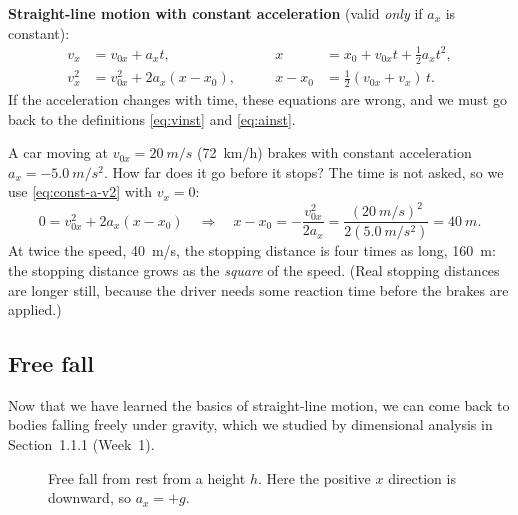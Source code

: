 \documentclass[11pt,a4paper]{article}
\begin{document}
\begin{keyresult}
\textbf{Straight-line motion with constant acceleration} (valid \emph{only} if $a_x$ is constant):
\[
\begin{aligned}
  v_x &= v_{0x} + a_x t , &\qquad x &= x_0 + v_{0x}t + \tfrac12 a_x t^2 , \\
  v_x^2 &= v_{0x}^2 + 2a_x(x - x_0) , &\qquad x - x_0 &= \tfrac12(v_{0x} + v_x)\,t .
\end{aligned}
\]
If the acceleration changes with time, these equations are wrong, and we must go back to the
definitions \eqref{eq:vinst} and \eqref{eq:ainst}.
\end{keyresult}

\begin{example}
A car moving at $v_{0x} = \qty{20}{m/s}$ (\qty{72}{km/h}) brakes with constant acceleration
$a_x = \qty{-5.0}{m/s^2}$. How far does it go before it stops? The time is not asked, so we use
\eqref{eq:const-a-v2} with $v_x = 0$:
\[
  0 = v_{0x}^2 + 2a_x(x - x_0) \quad\Rightarrow\quad
  x - x_0 = -\frac{v_{0x}^2}{2a_x} = \frac{(\qty{20}{m/s})^2}{2(\qty{5.0}{m/s^2})} = \qty{40}{m} .
\]
At twice the speed, \qty{40}{m/s}, the stopping distance is four times as long, \qty{160}{m}: the
stopping distance grows as the \emph{square} of the speed. (Real stopping distances are longer
still, because the driver needs some reaction time before the brakes are applied.)
\end{example}

\subsection{Free fall}\label{sec:freefall}

Now that we have learned the basics of straight-line motion, we can come back to bodies falling
freely under gravity, which we studied by dimensional analysis in Section~1.1.1 (Week~1).

\begin{figure}[ht]
\centering
\begin{minipage}[c]{0.40\textwidth}
\centering
{}
\end{minipage}\hfill
\begin{minipage}[c]{0.50\textwidth}
\caption{Free fall from rest from a height $h$. Here the positive $x$ direction is downward, so
$a_x = +g$.}\label{fig:freefall}
\end{minipage}
\end{figure}
\end{document}
